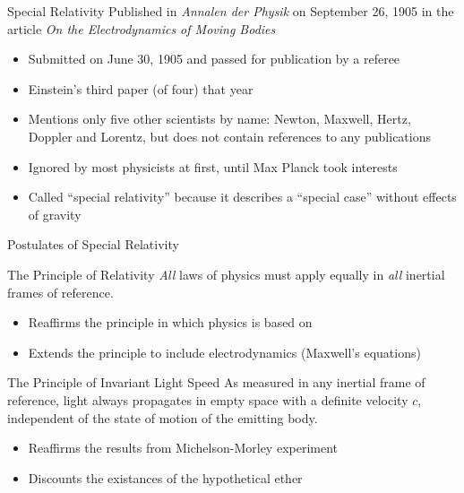 \documentclass[12pt,compress,aspectratio=169]{beamer}
\begin{document}
\begin{frame}{Special Relativity}
  Published in \emph{Annalen der Physik} on September 26, 1905 in the article
  \emph{On the Electrodynamics of Moving Bodies}
  \begin{itemize}
  \item Submitted on June 30, 1905 and passed for publication by a referee
  \item Einstein's third paper (of four) that year
  \item Mentions only five other scientists by name: Newton, Maxwell, Hertz,
    Doppler and Lorentz, but does not contain references to any publications
  \item Ignored by most physicists at first, until Max Planck took interests
  \item Called ``special relativity'' because it describes a ``special case''
    without effects of gravity
  \end{itemize}
\end{frame}



\begin{frame}{Postulates of Special Relativity}
  \begin{block}{The Principle of Relativity}
    \emph{All} laws of physics must apply equally in \emph{all} inertial frames
    of reference.
  \end{block}
  \begin{itemize}
  \item Reaffirms the principle in which physics is based on
  \item Extends the principle to include electrodynamics (Maxwell's equations)
  \end{itemize}

  \vspace{.1in}
  \begin{block}{The Principle of Invariant Light Speed}
    As measured in any inertial frame of reference, light always propagates in
    empty space with a definite velocity $c$, independent of the state of
    motion of the emitting body.
  \end{block}
  \begin{itemize}
  \item Reaffirms the results from Michelson-Morley experiment
  \item Discounts the existances of the  hypothetical ether
  \end{itemize}
\end{frame}
\end{document}
